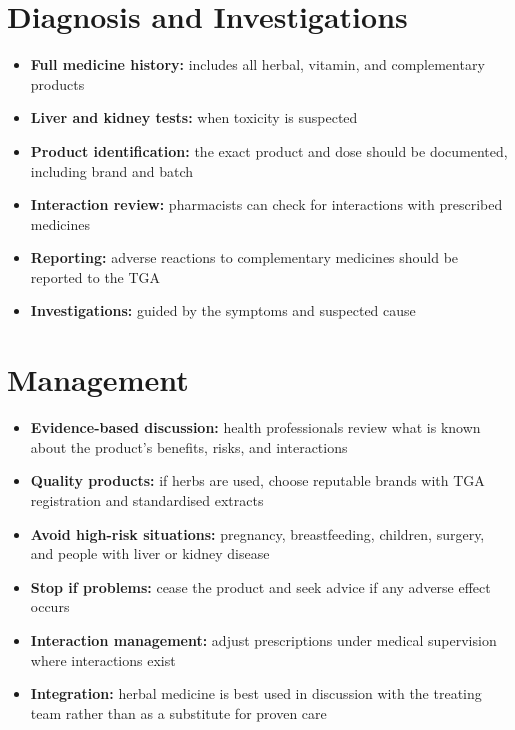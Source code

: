 \section*{Diagnosis and Investigations}
\begin{itemize}
    \item \textbf{Full medicine history:} includes all herbal, vitamin, and complementary products
    \item \textbf{Liver and kidney tests:} when toxicity is suspected
    \item \textbf{Product identification:} the exact product and dose should be documented, including brand and batch
    \item \textbf{Interaction review:} pharmacists can check for interactions with prescribed medicines
    \item \textbf{Reporting:} adverse reactions to complementary medicines should be reported to the TGA
    \item \textbf{Investigations:} guided by the symptoms and suspected cause
\end{itemize}

\section*{Management}
\begin{itemize}
    \item \textbf{Evidence-based discussion:} health professionals review what is known about the product's benefits, risks, and interactions
    \item \textbf{Quality products:} if herbs are used, choose reputable brands with TGA registration and standardised extracts
    \item \textbf{Avoid high-risk situations:} pregnancy, breastfeeding, children, surgery, and people with liver or kidney disease
    \item \textbf{Stop if problems:} cease the product and seek advice if any adverse effect occurs
    \item \textbf{Interaction management:} adjust prescriptions under medical supervision where interactions exist
    \item \textbf{Integration:} herbal medicine is best used in discussion with the treating team rather than as a substitute for proven care
\end{itemize}


